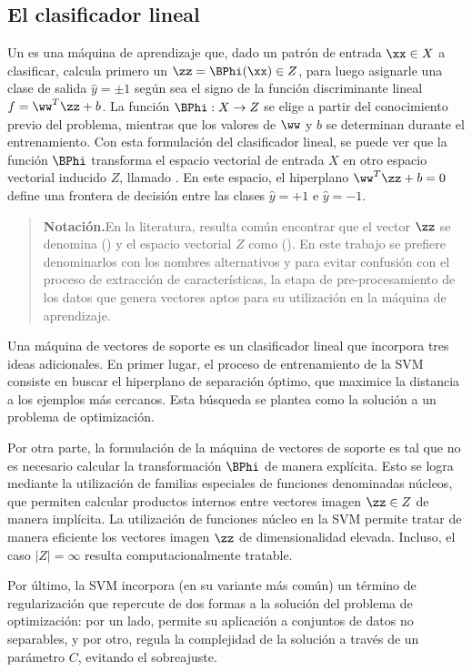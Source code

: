 %
%
\subsection{El clasificador lineal}
%
Un  \cite{nilsson} es una máquina de
aprendizaje que, dado un patrón de entrada $\xx\in{}X$ a clasificar,
calcula primero un  $\zz=\BPhi(\xx)\in{}Z$, para
luego asignarle una clase de salida $\hat{y}=\pm{}1$ según sea el
signo de la función discriminante lineal $f=\ww^T\zz+b$. La función
$\BPhi:X\rightarrow{}Z$ se elige a partir del conocimiento previo del
problema, mientras que los valores de $\ww$ y $b$ se determinan
durante el entrenamiento. Con esta formulación del clasificador
lineal, se puede ver que la función $\BPhi$ transforma el espacio
vectorial de entrada $X$ en otro espacio vectorial inducido $Z$,
llamado . En este espacio, el hiperplano
$\ww^T\zz+b=0$ define una frontera de decisión entre las clases
$\hat{y}=+1$ e $\hat{y}=-1$.
%
\begin{quote}
  {\bfseries Notación.}\quad{}En la literatura, resulta común
  encontrar que el vector $\zz$ se denomina  () y el espacio vectorial $Z$
  como  ().  En
  este trabajo se prefiere denominarlos con los nombres alternativos
   y  para evitar
  confusión con el proceso de extracción de características, la etapa
  de pre-procesamiento de los datos que genera vectores aptos para su
  utilización en la máquina de aprendizaje.
\end{quote}
%

Una máquina de vectores de soporte es un clasificador lineal que
incorpora tres ideas adicionales. En primer lugar, el proceso de
entrenamiento de la SVM consiste en buscar el hiperplano de separación
óptimo, que maximice la distancia a los ejemplos más cercanos. Esta
búsqueda se plantea como la solución a un problema de optimización.

Por otra parte, la formulación de la máquina de vectores de soporte
es tal que no es necesario
calcular la transformación $\BPhi$ de manera explícita. Esto se logra
mediante la utilización de familias especiales de funciones
denominadas núcleos, que permiten calcular productos internos entre
vectores imagen $\zz\in{}Z$ de manera implícita.  La utilización de
funciones núcleo en la SVM permite tratar de manera eficiente los
vectores imagen $\zz$ de dimensionalidad elevada.  Incluso, el caso
$|Z|=\infty$ resulta computacionalmente tratable.

Por último, la SVM incorpora (en su variante más común) un término de
regularización que repercute de dos formas a la solución del problema
de optimización: por un lado, permite su aplicación a conjuntos de
datos no separables, y por otro, regula la complejidad de la solución
a través de un parámetro $C$, evitando el sobreajuste.
